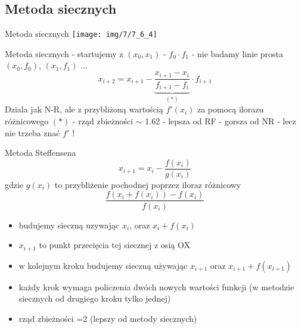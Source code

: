 \subsection{Metoda siecznych}
\begin{frame}{Metoda siecznych}
	\centering \texttt{[image: img/7/7\_6\_4]}
\end{frame}
\begin{frame}{Metoda siecznych}
	- startujemy z $(x_{0}, x_{1})$\linebreak
	- $f_{0} \cdot f_{1}$ - nie badamy\linebreak
	linie prosta $(x_{0}, f_{0})$, $(x_{1}, f_{1})$ $\ldots$
	\[
		x_{i+2} = x_{i+1} - \underbrace{\frac{x_{i+1} - x_{i}}{f_{i+1} - f_{i}}}_{(*)} \cdot f_{i+1}
	\]
 Dziala jak N-R, ale z przybliżoną wartością $f'(x_{i})$ za pomocą ilorazu różnicowego 	$(*)$  \linebreak\linebreak
	- rząd zbieżności $\sim$ 1.62 \hspace{5cm} \linebreak
	- lepsza od RF\linebreak
	- gorsza od NR - lecz nie trzeba znać $f'$ !
\end{frame}
\begin{frame}{Metoda Steffensena}
	$$
		 x_{i+1} = x_{i} - \frac{f(x_{i})}{g(x_{i})}
	$$
	gdzie $g(x_i)$ to 
 przybliżenie pochodnej poprzez iloraz różnicowy  $$\frac{f(x_i + f(x_i)) - f(x_i)}{f(x_i)}$$
  
 \begin{itemize}
 \item budujemy sieczną uzywając $x_i$, oraz $x_i+f(x_i)$
 \item $x_{i+1}$ to punkt przecięcia tej siecznej z osią OX
 \item w kolejnym kroku budujemy  sieczną używając $x_{i+1}$ oraz $x_{i+1}+f(x_{i+1})$
     \item  każdy krok wymaga policzenia dwóch nowych wartości funkcji (w metodzie siecznych od drugiego kroku tylko jednej) 
     \item rząd zbieżności =2 (lepszy od metody  siecznych)
 \end{itemize}
\end{frame}

